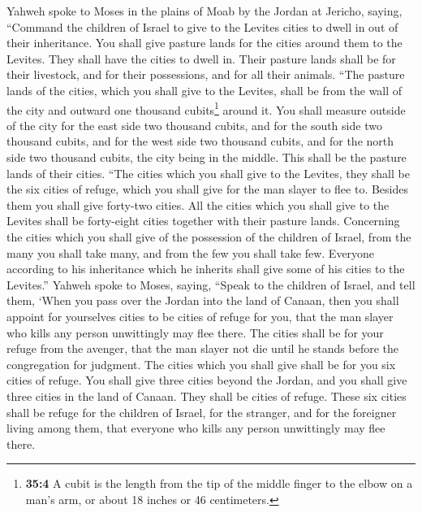 Yahweh spoke to Moses in the plains of Moab by the Jordan
at Jericho, saying,  ``Command the children of Israel to
give to the Levites cities to dwell in out of their inheritance. You
shall give pasture lands for the cities around them to the Levites.
 They shall have the cities to dwell in. Their pasture
lands shall be for their livestock, and for their possessions, and for
all their animals.  ``The pasture lands of the cities,
which you shall give to the Levites, shall be from the wall of the city
and outward one thousand cubits\footnote{\textbf{35:4} A cubit is the
  length from the tip of the middle finger to the elbow on a man's arm,
  or about 18 inches or 46 centimeters.} around it.  You
shall measure outside of the city for the east side two thousand cubits,
and for the south side two thousand cubits, and for the west side two
thousand cubits, and for the north side two thousand cubits, the city
being in the middle. This shall be the pasture lands of their cities.
 ``The cities which you shall give to the Levites, they
shall be the six cities of refuge, which you shall give for the man
slayer to flee to. Besides them you shall give forty-two cities.
 All the cities which you shall give to the Levites shall
be forty-eight cities together with their pasture lands. 
Concerning the cities which you shall give of the possession of the
children of Israel, from the many you shall take many, and from the few
you shall take few. Everyone according to his inheritance which he
inherits shall give some of his cities to the Levites.'' 
Yahweh spoke to Moses, saying,  ``Speak to the children
of Israel, and tell them, `When you pass over the Jordan into the land
of Canaan,  then you shall appoint for yourselves cities
to be cities of refuge for you, that the man slayer who kills any person
unwittingly may flee there.  The cities shall be for your
refuge from the avenger, that the man slayer not die until he stands
before the congregation for judgment.  The cities which
you shall give shall be for you six cities of refuge. 
You shall give three cities beyond the Jordan, and you shall give three
cities in the land of Canaan. They shall be cities of refuge.
 These six cities shall be refuge for the children of
Israel, for the stranger, and for the foreigner living among them, that
everyone who kills any person unwittingly may flee there.


